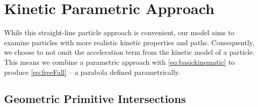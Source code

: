 







\section{Kinetic Parametric Approach}

While this straight-line particle approach is convenient, our model aims to examine particles with more realistic kinetic properties and paths. Consequently, we choose to not omit the acceleration term from the kinetic model of a particle. This means we combine a parametric approach with \eqref{eq:basickinematic} to produce \eqref{eq:freeFall} -- a parabola defined parametrically.



	\subsection{Geometric Primitive Intersections}

